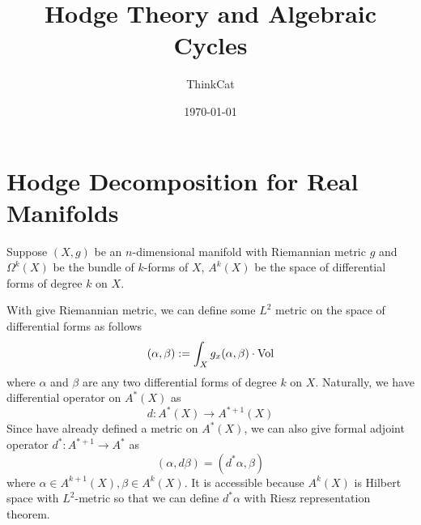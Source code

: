 \documentclass[11pt,oneside,a4paper]{amsart}
\title{Hodge Theory and Algebraic Cycles}
\author{ThinkCat}
\date{\today}
\begin{document}
\maketitle
\section{Hodge Decomposition for Real Manifolds}
Suppose $(X,g)$ be an $n$-dimensional manifold with Riemannian metric $g$ and $\Omega^k (X)$ be the bundle of $k$-forms of $X$, $A^k (X)$ be the space of differential forms of degree $k$ on $X$.

With give Riemannian metric, we can define some $L^2$ metric on the space of differential forms as follows
$$
(\alpha, \beta) := \int_{X} g_x(\alpha, \beta) \cdot \operatorname*{Vol}   
$$
where $\alpha$ and $\beta$ are any two differential forms of degree $k$ on $X$. Naturally, we have differential operator on $A^*(X)$ as
$$
d: A^*(X) \rightarrow A^{*+1}(X)
$$
Since have already defined a metric on $A^*(X)$,  we can also give formal adjoint operator $d^*: A^{*+1} \rightarrow A^*$ as
$$
(\alpha, d\beta)=(d^*\alpha, \beta)
$$
where $\alpha \in A^{k+1}(X), \beta \in A^k(X)$. It is accessible because $A^k(X)$ is Hilbert space with $L^2$-metric so that we can define $d^* \alpha$ with Riesz representation theorem.
\end{document}
